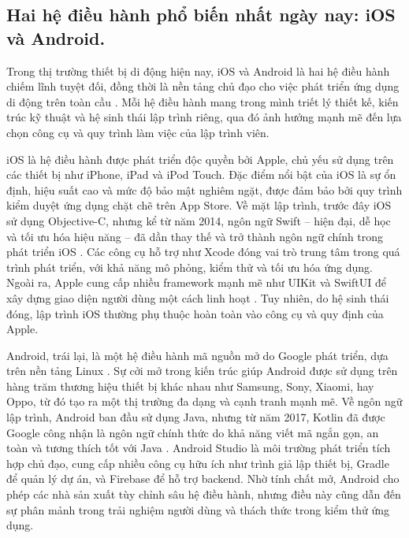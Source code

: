 \subsection{Hai hệ điều hành phổ biến nhất ngày nay: iOS và Android.}
\renewcommand{\labelitemi}{--}   
\begin{flushleft}
  \hspace*{0.8cm}Trong thị trường thiết bị di động hiện nay, iOS và Android là hai hệ điều hành chiếm lĩnh tuyệt đối, đồng thời là nền tảng chủ đạo cho việc phát triển ứng dụng di động trên toàn cầu \cite{statcounter}. Mỗi hệ điều hành mang trong mình triết lý thiết kế, kiến trúc kỹ thuật và hệ sinh thái lập trình riêng, qua đó ảnh hưởng mạnh mẽ đến lựa chọn công cụ và quy trình làm việc của lập trình viên.
\end{flushleft}
    \begin{flushleft}
        \hspace*{0.8cm}iOS là hệ điều hành được phát triển độc quyền bởi Apple, chủ yếu sử dụng trên các thiết bị như iPhone, iPad và iPod Touch. Đặc điểm nổi bật của iOS là sự ổn định, hiệu suất cao và mức độ bảo mật nghiêm ngặt, được đảm bảo bởi quy trình kiểm duyệt ứng dụng chặt chẽ trên App Store. Về mặt lập trình, trước đây iOS sử dụng Objective-C, nhưng kể từ năm 2014, ngôn ngữ Swift – hiện đại, dễ học và tối ưu hóa hiệu năng – đã dần thay thế và trở thành ngôn ngữ chính trong phát triển iOS \cite{swift}. Các công cụ hỗ trợ như Xcode đóng vai trò trung tâm trong quá trình phát triển, với khả năng mô phỏng, kiểm thử và tối ưu hóa ứng dụng. Ngoài ra, Apple cung cấp nhiều framework mạnh mẽ như UIKit và SwiftUI để xây dựng giao diện người dùng một cách linh hoạt \cite{swiftui}. Tuy nhiên, do hệ sinh thái đóng, lập trình iOS thường phụ thuộc hoàn toàn vào công cụ và quy định của Apple.
    \end{flushleft}

    \begin{flushleft}
      \hspace*{0.8cm}Android, trái lại, là một hệ điều hành mã nguồn mở do Google phát triển, dựa trên nền tảng Linux \cite{android_open}. Sự cởi mở trong kiến trúc giúp Android được sử dụng trên hàng trăm thương hiệu thiết bị khác nhau như Samsung, Sony, Xiaomi, hay Oppo, từ đó tạo ra một thị trường đa dạng và cạnh tranh mạnh mẽ. Về ngôn ngữ lập trình, Android ban đầu sử dụng Java, nhưng từ năm 2017, Kotlin đã được Google công nhận là ngôn ngữ chính thức do khả năng viết mã ngắn gọn, an toàn và tương thích tốt với Java \cite{kotlin}. Android Studio là môi trường phát triển tích hợp chủ đạo, cung cấp nhiều công cụ hữu ích như trình giả lập thiết bị, Gradle để quản lý dự án, và Firebase để hỗ trợ backend. Nhờ tính chất mở, Android cho phép các nhà sản xuất tùy chỉnh sâu hệ điều hành, nhưng điều này cũng dẫn đến sự phân mảnh trong trải nghiệm người dùng và thách thức trong kiểm thử ứng dụng.
    \end{flushleft}


